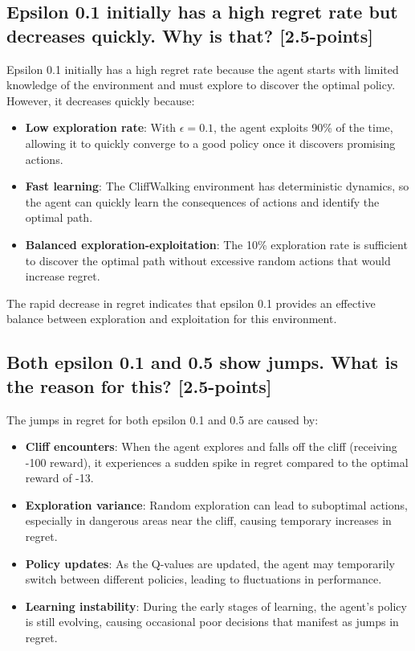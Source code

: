 \documentclass[12pt]{article}
\begin{document}
{{{\subsection{Epsilon 0.1 initially has a high regret rate but decreases quickly. Why is that? [2.5-points]}

Epsilon 0.1 initially has a high regret rate because the agent starts with limited knowledge of the environment and must explore to discover the optimal policy. However, it decreases quickly because:

\begin{itemize}
    \item \textbf{Low exploration rate}: With $\epsilon = 0.1$, the agent exploits 90\% of the time, allowing it to quickly converge to a good policy once it discovers promising actions.
    \item \textbf{Fast learning}: The CliffWalking environment has deterministic dynamics, so the agent can quickly learn the consequences of actions and identify the optimal path.
    \item \textbf{Balanced exploration-exploitation}: The 10\% exploration rate is sufficient to discover the optimal path without excessive random actions that would increase regret.
\end{itemize}

The rapid decrease in regret indicates that epsilon 0.1 provides an effective balance between exploration and exploitation for this environment.

\subsection{Both epsilon 0.1 and 0.5 show jumps. What is the reason for this? [2.5-points]}

The jumps in regret for both epsilon 0.1 and 0.5 are caused by:

\begin{itemize}
    \item \textbf{Cliff encounters}: When the agent explores and falls off the cliff (receiving -100 reward), it experiences a sudden spike in regret compared to the optimal reward of -13.
    \item \textbf{Exploration variance}: Random exploration can lead to suboptimal actions, especially in dangerous areas near the cliff, causing temporary increases in regret.
    \item \textbf{Policy updates}: As the Q-values are updated, the agent may temporarily switch between different policies, leading to fluctuations in performance.
    \item \textbf{Learning instability}: During the early stages of learning, the agent's policy is still evolving, causing occasional poor decisions that manifest as jumps in regret.
\end{itemize}

}}}
\end{document}
